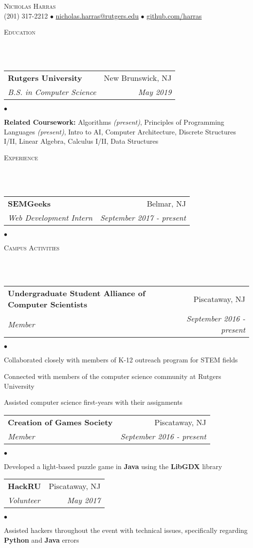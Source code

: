 \documentclass[12pt]{article}
\makeatletter
\newcommand{\lineunder}{
	\vspace*{-8pt} \\ 
	\hspace*{-18pt} 
	\hrulefill \\
}
\newcommand{\header}[1]{
	\vspace*{2pt}
	{\hspace*{-14pt}\vspace*{6pt} \textsc{#1}} 
	\vspace*{-6pt} 
	\lineunder
}
\newcommand{\contact}[2]{
	\vspace*{-8pt}
	\begin{center}
		{\LARGE \scshape {#1}}\\
		#2
	\end{center}
	\vspace*{-8pt}
}
\newenvironment{achievements}{
  \begin{list}{$\bullet$}{
  	\topsep 0pt \itemsep -4pt}}
  	{\vspace*{2pt}\end{list}
}
\newcommand{\mailto}[1]{
	\href{mailto:#1}{#1}}
\newcommand{\subheading}[4]{
 	\vspace{5pt}
    	\begin{tabular*}{1.01\textwidth}{l@{\extracolsep{\fill}}r}
      		\textbf{#1} & #2 \\
      		\textit{\small#3} & \textit{\small #4} \\
    	\end{tabular*}\vspace{-5pt}
}
\makeatother
\begin{document}
\small
\smallskip
\vspace*{-44pt}

\contact{Nicholas Harras}{(201) 317-2212 $\bullet$ \mailto{nicholas.harras@rutgers.edu} $\bullet$ \href{https://www.github.com/harras}{github.com/harras}}

\header{Education}

\subheading
	{Rutgers University}{New Brunswick, NJ}
	{B.S. in Computer Science}{May 2019}
	\begin{achievements}	
	\item{\bf Related Coursework:} Algorithms \textit{(present)}, Principles of Programming Languages \textit{(present)}, Intro to AI, Computer Architecture, Discrete Structures I/II, Linear Algebra, Calculus I/II, Data Structures
	\end{achievements}

\header{Experience}

\subheading
	{SEMGeeks}{Belmar, NJ}
	{Web Development Intern}{September 2017 - \textit{present}}
	\begin{achievements}
		\item 
	\end{achievements}

\header{Campus Activities}

\subheading
	{Undergraduate Student Alliance of Computer Scientists}{Piscataway, NJ}
	{Member}{September 2016 - \textit{present}}
	\begin{achievements}
		\item Collaborated closely with members of K-12 outreach program for STEM fields
		\item Connected with members of the computer science community at Rutgers University
		\item Assisted computer science first-years with their assignments
	\end{achievements}
	
\subheading
	{Creation of Games Society}{Piscataway, NJ}
	{Member}{September 2016 - \textit{present}}
	\begin{achievements}
		\item Developed a light-based puzzle game in \textbf{Java} using the \textbf{LibGDX} library
		\item 
	\end{achievements}
	
\subheading
	{HackRU}{Piscataway, NJ}
	{Volunteer}{May 2017}
	\begin{achievements}
		\item Assisted hackers throughout the event with technical issues, specifically regarding \textbf{Python} and \textbf{Java} errors
	\end{achievements}
\end{document}
